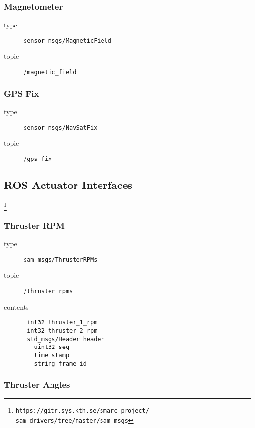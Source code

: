 \documentclass[9pt,technote]{IEEEtran} %
\begin{document}
\subsubsection{Magnetometer}

\begin{description}
\item[type] \texttt{sensor\_msgs/MagneticField}
\item[topic] \texttt{/magnetic\_field}
\end{description}

\subsubsection{GPS Fix} 

\begin{description}
\item[type] \texttt{sensor\_msgs/NavSatFix}
\item[topic] \texttt{/gps\_fix}
\end{description}

\subsection{ROS Actuator Interfaces}

\footnote{\texttt{https://gitr.sys.kth.se/smarc-project/\\sam\_drivers/tree/master/sam\_msgs}}

\subsubsection{Thruster RPM}

\begin{description}
\item[type] \texttt{sam\_msgs/ThrusterRPMs}
\item[topic] \texttt{/thruster\_rpms}
\item[contents] \begin{scriptsize}
\begin{verbatim}
 int32 thruster_1_rpm
 int32 thruster_2_rpm
 std_msgs/Header header
   uint32 seq
   time stamp
   string frame_id
\end{verbatim}
\end{scriptsize}
\end{description}

\subsubsection{Thruster Angles}
\end{document}
